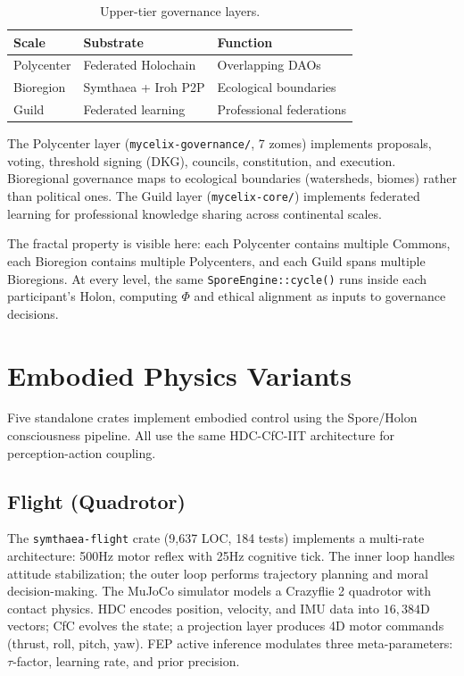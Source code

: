 \documentclass[11pt,twocolumn]{article}
\newcommand{\dimHDC}{16{,}384}
\begin{document}
\begin{table}[H]
\centering
\caption{Upper-tier governance layers.}
\label{tab:upper-tiers}
\begin{tabular}{lll}
\toprule
\textbf{Scale} & \textbf{Substrate} & \textbf{Function} \\
\midrule
Polycenter & Federated Holochain & Overlapping DAOs \\
Bioregion & Symthaea + Iroh P2P & Ecological boundaries \\
Guild & Federated learning & Professional federations \\
\bottomrule
\end{tabular}
\end{table}

The Polycenter layer (\texttt{mycelix-governance/}, 7 zomes) implements proposals, voting, threshold signing (DKG), councils, constitution, and execution. Bioregional governance maps to ecological boundaries (watersheds, biomes) rather than political ones. The Guild layer (\texttt{mycelix-core/}) implements federated learning for professional knowledge sharing across continental scales.

The fractal property is visible here: each Polycenter contains multiple Commons, each Bioregion contains multiple Polycenters, and each Guild spans multiple Bioregions. At every level, the same \texttt{SporeEngine::cycle()} runs inside each participant's Holon, computing $\Phi$ and ethical alignment as inputs to governance decisions.

\section{Embodied Physics Variants}
\label{sec:embodied}

Five standalone crates implement embodied control using the Spore/Holon consciousness pipeline. All use the same HDC-CfC-IIT architecture for perception-action coupling.

\subsection{Flight (Quadrotor)}

The \texttt{symthaea-flight} crate (9,637 LOC, 184 tests) implements a multi-rate architecture: 500Hz motor reflex with 25Hz cognitive tick. The inner loop handles attitude stabilization; the outer loop performs trajectory planning and moral decision-making. The MuJoCo simulator models a Crazyflie 2 quadrotor with contact physics. HDC encodes position, velocity, and IMU data into $\dimHDC$D vectors; CfC evolves the state; a projection layer produces 4D motor commands (thrust, roll, pitch, yaw). FEP active inference modulates three meta-parameters: $\tau$-factor, learning rate, and prior precision.
\end{document}
